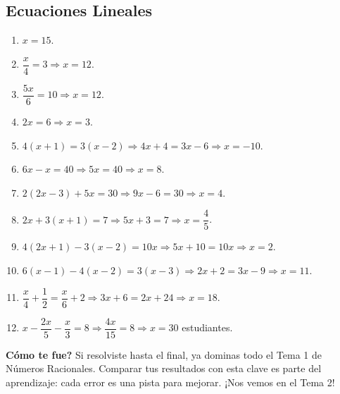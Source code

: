\documentclass[12pt, letterpaper]{article}
\begin{document}
  \subsection*{Ecuaciones Lineales}
  \begin{enumerate}[leftmargin=*, label=\textbf{\arabic*.}]
    \item $x = 15$.
    \item $\dfrac{x}{4} = 3 \Rightarrow x = 12$.
    \item $\dfrac{5x}{6} = 10 \Rightarrow x = 12$.
    \item $2x = 6 \Rightarrow x = 3$.
    \item $4(x + 1) = 3(x - 2) \Rightarrow 4x + 4 = 3x - 6 \Rightarrow x = -10$.
    \item $6x - x = 40 \Rightarrow 5x = 40 \Rightarrow x = 8$.
    \item $2(2x - 3) + 5x = 30 \Rightarrow 9x - 6 = 30 \Rightarrow x = 4$.
    \item $2x + 3(x + 1) = 7 \Rightarrow 5x + 3 = 7 \Rightarrow x = \dfrac{4}{5}$.
    \item $4(2x + 1) - 3(x - 2) = 10x \Rightarrow 5x + 10 = 10x \Rightarrow x = 2$.
    \item $6(x - 1) - 4(x - 2) = 3(x - 3) \Rightarrow 2x + 2 = 3x - 9 \Rightarrow x = 11$.
    \item $\dfrac{x}{4} + \dfrac{1}{2} = \dfrac{x}{6} + 2 \Rightarrow 3x + 6 = 2x + 24 \Rightarrow x = 18$.
    \item $x - \dfrac{2x}{5} - \dfrac{x}{3} = 8 \Rightarrow \dfrac{4x}{15} = 8 \Rightarrow x = 30$ estudiantes.
  \end{enumerate}

  \vspace{10pt}
  \begin{cuadrosolucion}
    \textbf{\textquestiondown Cómo te fue?} Si resolviste hasta el final, ya dominas todo el Tema 1 de Números Racionales. Comparar tus resultados con esta clave es parte del aprendizaje: cada error es una pista para mejorar. ¡Nos vemos en el Tema 2!
  \end{cuadrosolucion}

\fi
\end{document}

